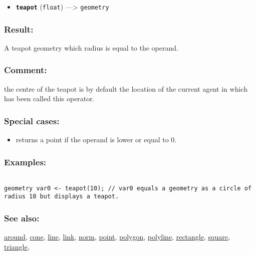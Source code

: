 \documentclass[]{book}
\providecommand{\tightlist}{%
  \setlength{\itemsep}{0pt}\setlength{\parskip}{0pt}}
\theoremstyle{definition}
\theoremstyle{definition}
\theoremstyle{definition}
\theoremstyle{remark}
\begin{document}
\begin{itemize}
\tightlist
\item
  \textbf{\texttt{teapot}} (\texttt{float}) ---\textgreater{}
  \texttt{geometry}
\end{itemize}

\subsubsection{Result:}\label{result-499}

A teapot geometry which radius is equal to the operand.

\subsubsection{Comment:}\label{comment-98}

the centre of the teapot is by default the location of the current agent
in which has been called this operator.

\subsubsection{Special cases:}\label{special-cases-136}

\begin{itemize}
\tightlist
\item
  returns a point if the operand is lower or equal to 0.
\end{itemize}

\subsubsection{Examples:}\label{examples-357}

\begin{verbatim}
 
geometry var0 <- teapot(10); // var0 equals a geometry as a circle of radius 10 but displays a teapot.
\end{verbatim}

\subsubsection{See also:}\label{see-also-204}

\href{OperatorsAA\#around}{around}, \href{OperatorsBC\#cone}{cone},
\href{OperatorsIM\#line}{line}, \href{OperatorsIM\#link}{link},
\href{OperatorsNR\#norm}{norm}, \href{OperatorsNR\#point}{point},
\href{OperatorsNR\#polygon}{polygon},
\href{OperatorsNR\#polyline}{polyline},
\href{OperatorsNR\#rectangle}{rectangle},
\href{OperatorsSZ\#square}{square},
\href{OperatorsSZ\#triangle}{triangle},
\end{document}
